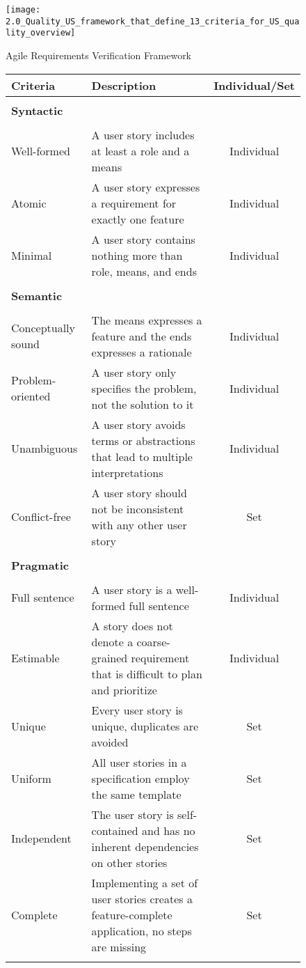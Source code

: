 \begin{figure}
\center
\texttt{[image: 2.0\_Quality\_US\_framework\_that\_define\_13\_criteria\_for\_US\_quality\_overview]}
\caption{Agile Requirements Verification Framework \cite{lucassen2016improving}}\label{fig:qus_framework}
\end{figure}

\begin{figure}
\begingroup
\footnotesize

\begin{tabularx}{\textwidth}{l  X  c}
 \hline
 Criteria & Description & Individual/Set \\
\hline
\hline
\\
\textbf{Syntactic} \\
\\ 
Well-formed & A user story includes at least a role and a means & Individual \\
Atomic & A user story expresses a requirement for exactly one feature & Individual \\
Minimal & A user story contains nothing more than role, means, and ends & Individual \\
\\ 
 \textbf{Semantic} \\
 \\ 
Conceptually sound&The means expresses a feature and the ends expresses a rationale & Individual\\
Problem-oriented& A user story only specifies the problem, not the solution to it& Individual\\
Unambiguous&A user story avoids terms or abstractions that lead to multiple interpretations &Individual \\
Conflict-free&A user story should not be inconsistent with any other user story &Set \\
\\ 
\textbf{Pragmatic}\\
\\ 
Full sentence&A user story is a well-formed full sentence &Individual \\
Estimable&A story does not denote a coarse-grained requirement that is difficult to plan and prioritize &Individual \\
Unique&Every user story is unique, duplicates are avoided &Set \\
Uniform&All user stories in a specification employ the same template &Set \\
Independent&The user story is self-contained and has no inherent dependencies on other stories &Set \\
Complete&Implementing a set of user stories creates a feature-complete application, no steps are missing &Set \\
 \\
 \hline

\end{tabularx}
\label{tb:qus}
\endgroup
\end{figure}
